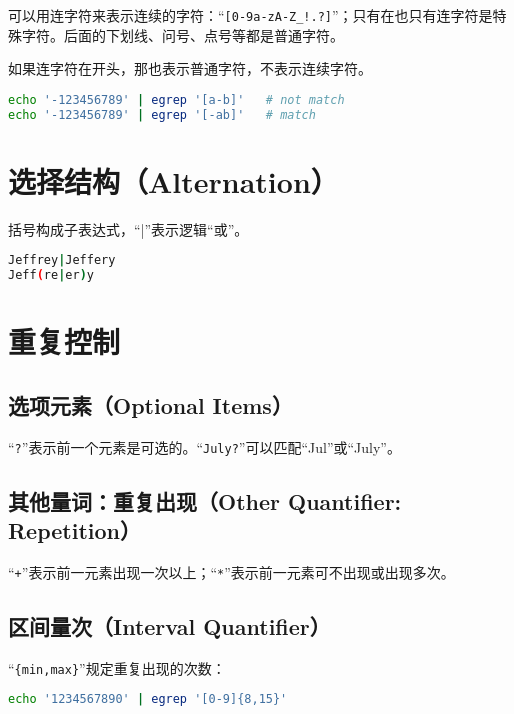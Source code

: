 可以用连字符来表示连续的字符：“\verb|[0-9a-zA-Z_!.?]|”；只有在也只有连字符是特殊字符。后面的下划线、问号、点号等都是普通字符。

如果连字符在开头，那也表示普通字符，不表示连续字符。
\begin{lstlisting}[language=bash]
echo '-123456789' | egrep '[a-b]'   # not match
echo '-123456789' | egrep '[-ab]'   # match
\end{lstlisting}





\section{选择结构（Alternation）}

括号构成子表达式，“\verb|||”表示逻辑“或”。
\begin{lstlisting}[language=bash]
Jeffrey|Jeffery
Jeff(re|er)y
\end{lstlisting}




\section{重复控制}

\subsection{选项元素（Optional Items）}

“\verb|?|”表示前一个元素是可选的。“\verb|July?|”可以匹配“Jul”或“July”。

\subsection{其他量词：重复出现（Other Quantifier: Repetition）}

“\verb|+|”表示前一元素出现一次以上；“\verb|*|”表示前一元素可不出现或出现多次。

\subsection{区间量次（Interval Quantifier）}

“\verb|{min,max}|”规定重复出现的次数：
\begin{lstlisting}[language=bash]
echo '1234567890' | egrep '[0-9]{8,15}' 
\end{lstlisting}





